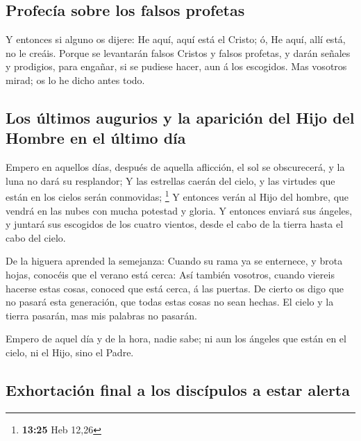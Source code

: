 \hypertarget{profecuxeda-sobre-los-falsos-profetas}{%
\subsection{Profecía sobre los falsos
profetas}\label{profecuxeda-sobre-los-falsos-profetas}}

 Y entonces si alguno os dijere: He aquí, aquí está el
Cristo; ó, He aquí, allí está, no le creáis.  Porque se
levantarán falsos Cristos y falsos profetas, y darán señales y
prodigios, para engañar, si se pudiese hacer, aun á los escogidos.
 Mas vosotros mirad; os lo he dicho antes todo.

\hypertarget{los-uxfaltimos-augurios-y-la-apariciuxf3n-del-hijo-del-hombre-en-el-uxfaltimo-duxeda}{%
\subsection{Los últimos augurios y la aparición del Hijo del Hombre en
el último
día}\label{los-uxfaltimos-augurios-y-la-apariciuxf3n-del-hijo-del-hombre-en-el-uxfaltimo-duxeda}}

 Empero en aquellos días, después de aquella aflicción,
el sol se obscurecerá, y la luna no dará su resplandor; 
Y las estrellas caerán del cielo, y las virtudes que están en los cielos
serán conmovidas; \footnote{\textbf{13:25} Heb 12,26}  Y
entonces verán al Hijo del hombre, que vendrá en las nubes con mucha
potestad y gloria.  Y entonces enviará sus ángeles, y
juntará sus escogidos de los cuatro vientos, desde el cabo de la tierra
hasta el cabo del cielo.

 De la higuera aprended la semejanza: Cuando su rama ya
se enternece, y brota hojas, conocéis que el verano está cerca:
 Así también vosotros, cuando viereis hacerse estas
cosas, conoced que está cerca, á las puertas.  De cierto
os digo que no pasará esta generación, que todas estas cosas no sean
hechas.  El cielo y la tierra pasarán, mas mis palabras
no pasarán.

 Empero de aquel día y de la hora, nadie sabe; ni aun los
ángeles que están en el cielo, ni el Hijo, sino el Padre.

\hypertarget{exhortaciuxf3n-final-a-los-discuxedpulos-a-estar-alerta}{%
\subsection{Exhortación final a los discípulos a estar
alerta}\label{exhortaciuxf3n-final-a-los-discuxedpulos-a-estar-alerta}}

